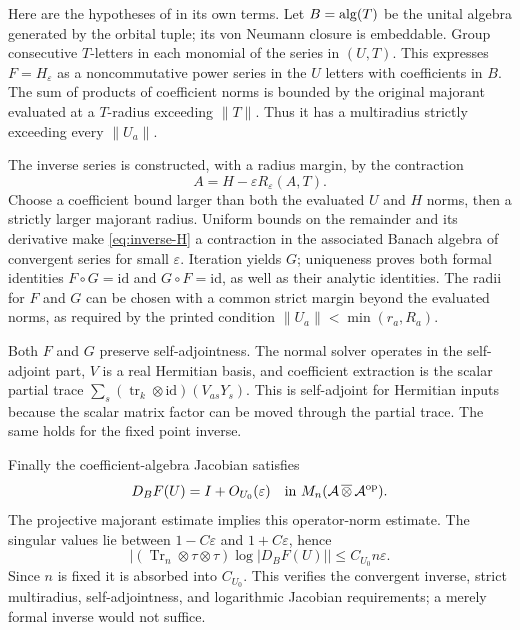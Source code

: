 \documentclass[11pt]{article}
\theoremstyle{definition}\newtheorem{definition}[theorem]{Definition}
\theoremstyle{remark}\newtheorem{remark}[theorem]{Remark}
\DeclareMathOperator{\Tr}{Tr}\DeclareMathOperator{\tr}{tr}
\newcommand{\eps}{\varepsilon}\newcommand{\id}{\mathrm{id}}
\begin{document}
Here are the hypotheses of \cite[Theorem 4.1]{Shly} in its own terms.
Let $B=\operatorname{alg}(T)$ be the unital algebra generated by the orbital tuple;
its von Neumann closure is embeddable. Group consecutive $T$-letters
in each monomial of the series in $(U,T)$. This expresses
$F=H_\eps$ as a noncommutative power series in the $U$ letters with
coefficients in $B$. The sum of products of coefficient norms is
bounded by the original majorant evaluated at a $T$-radius exceeding
$\|T\|$. Thus it has a multiradius strictly exceeding every $\|U_a\|$.

The inverse series is constructed, with a radius margin, by the
contraction
\begin{equation}\label{eq:inverse-H}
 A=H-\eps R_\eps(A,T).
\end{equation}
Choose a coefficient bound larger than both the evaluated $U$ and $H$
norms, then a strictly larger majorant radius. Uniform bounds on the
remainder and its derivative make \eqref{eq:inverse-H} a contraction
in the associated Banach algebra of convergent series for small
$\eps$. Iteration yields $G$; uniqueness proves both formal identities
$F\circ G=\id$ and $G\circ F=\id$, as well as their analytic
identities. The radii for $F$ and $G$ can be chosen with a common
strict margin beyond the evaluated norms, as required by the printed
condition $\|U_a\|<\min(r_a,R_a)$.

Both $F$ and $G$ preserve self-adjointness. The normal solver operates
in the self-adjoint part, $V$ is a real Hermitian basis, and coefficient
extraction is the scalar partial trace
$\sum_s(\tr_k\otimes\id)(V_{as}Y_s)$. This is self-adjoint for
Hermitian inputs because the scalar matrix factor can be moved through
the partial trace. The same holds for the fixed point inverse.

Finally the coefficient-algebra Jacobian satisfies
\[
 D_BF(U)=I+O_{U_0}(\eps)
 \quad\hbox{in }M_n(\mathcal A\,\overline\otimes\,\mathcal A^{\op}).
\]
The projective majorant estimate implies this operator-norm estimate.
The singular values lie between $1-C\eps$ and $1+C\eps$, hence
\begin{equation}\label{eq:logjac}
 \big|(\Tr_n\otimes\tau\otimes\tau)\log|D_BF(U)|\big|
 \leq C_{U_0}n\eps.
\end{equation}
Since $n$ is fixed it is absorbed into $C_{U_0}$.
This verifies the convergent inverse, strict multiradius,
self-adjointness, and logarithmic Jacobian requirements; a merely
formal inverse would not suffice.
\end{document}
